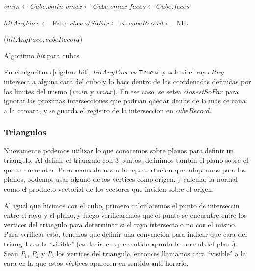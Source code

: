\begin{algorithm}[H]
\begin{algorithmic}[1]
    \State $vmin \gets Cube.vmin$ 
    \State $vmax \gets Cube.vmax$
    \State $faces \gets Cube.faces$

    \State $hitAnyFace \gets$ False
    \State $closestSoFar \gets \infty$
    \State $cubeRecord \gets$ NIL

     

        \EndIf
    \EndFor

    \State \Return ($hitAnyFace, cubeRecord$)
\EndFunction
\end{algorithmic}
\caption{Algoritmo \textit{hit} para cubos}
\label{alg:box-hit}
\end{algorithm}

En el algoritmo \ref{alg:box-hit}, $hitAnyFace$ es \texttt{True} si y solo si el
rayo $Ray$ interseca a alguna cara del cubo y lo hace dentro de las coordenadas
definidas por los limites del mismo ($vmin$ y $vmax$). En ese caso, se setea
$closestSoFar$ para ignorar las proximas intersecciones que podrían quedar detrás
de la más cercana a la camara, y se guarda el registro de la interseccion en
$cubeRecord$.

\subsubsection{Triangulos}

Nuevamente podemos utilizar lo que conocemos sobre planos para definir un
triangulo. Al definir el triangulo con 3 puntos, definimos tambin el plano sobre
el que se encuentra. Para acomodarnos a la representacion que adoptamos para los
planos, podemos usar alguno de los vertices como origen, y calcular la normal
como el producto vectorial de los vectores que inciden sobre el origen.


Al igual que hicimos con el cubo, primero calcularemos el punto de interseccin
entre el rayo y el plano, y luego verificaremos que el punto se encuentre entre
los vertices del triangulo para determinar si el rayo intersecta o no con el
mismo. Para verificar esto, tenemos que definir una convención para indicar que
cara del triangulo es la ``visible'' (es decir, en que sentido apunta la normal
del plano). Sean $P_1$, $P_2$ y $P_3$ los vertices del triangulo, entonces llamamos
cara ``visible'' a la cara en la que estos vértices aparecen en sentido anti-horario.

